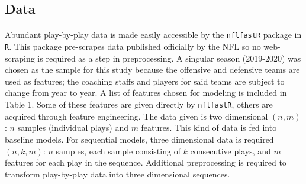 \documentclass{article}
\begin{document}
\begin{multicols*}{2}
        \subsection{Data}
            \paragraph{}
                Abundant play-by-play data is made easily accessible by the \texttt{nflfastR} package in \texttt{R}. 
                This package pre-scrapes data published officially by the NFL so no web-scraping is required as a step in preprocessing.
                A singular season (2019-2020) was chosen as the sample for this study because the offensive and defensive teams are used as features; the coaching staffs and players for said teams are subject to change from year to year.
                A list of features chosen for modeling is included in Table 1. 
                Some of these features are given directly by \texttt{nflfastR}, others are acquired through feature engineering.
                The data given is two dimensional $(n,m)$: $n$ samples (individual plays) and $m$ features. 
                This kind of data is fed into baseline models.
                For sequential models, three dimensional data is required $(n,k,m)$: $n$ samples, each sample consisting of $k$ consecutive plays, and $m$ features for each play in the sequence. 
                Additional preprocessing is required to transform play-by-play data into three dimensional sequences. 
                
                 

                

    \end{multicols*}
\end{document}
